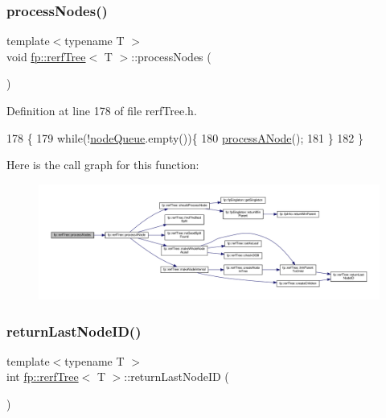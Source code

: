 \subsubsection{\texorpdfstring{process\+Nodes()}{processNodes()}}
{\footnotesize\ttfamily template$<$typename T $>$ \\
void \hyperlink{classfp_1_1rerfTree}{fp\+::rerf\+Tree}$<$ T $>$\+::process\+Nodes (\begin{DoxyParamCaption}{ }\end{DoxyParamCaption})\hspace{0.3cm}{\ttfamily [inline]}}



Definition at line 178 of file rerf\+Tree.\+h.


\begin{DoxyCode}
178                                    \{
179                     \textcolor{keywordflow}{while}(!\hyperlink{classfp_1_1rerfTree_a59b3bdcba86acbe93fd46658132218a8}{nodeQueue}.empty())\{
180                         \hyperlink{classfp_1_1rerfTree_a69c175640d930d630504875e60b3b780}{processANode}();
181                     \}
182                 \}
\end{DoxyCode}
Here is the call graph for this function\+:
\nopagebreak
\begin{figure}[H]
\begin{center}
\leavevmode
\includegraphics[width=350pt]{classfp_1_1rerfTree_aa8281a45487868e4cf8e3dad9d9be8d3_cgraph}
\end{center}
\end{figure}
\mbox{\label{classfp_1_1rerfTree_a99ed99d742ffd7f6f38487434a14b9ff}} 
\subsubsection{\texorpdfstring{return\+Last\+Node\+I\+D()}{returnLastNodeID()}}
{\footnotesize\ttfamily template$<$typename T $>$ \\
int \hyperlink{classfp_1_1rerfTree}{fp\+::rerf\+Tree}$<$ T $>$\+::return\+Last\+Node\+ID (\begin{DoxyParamCaption}{ }\end{DoxyParamCaption})\hspace{0.3cm}{\ttfamily [inline]}}



